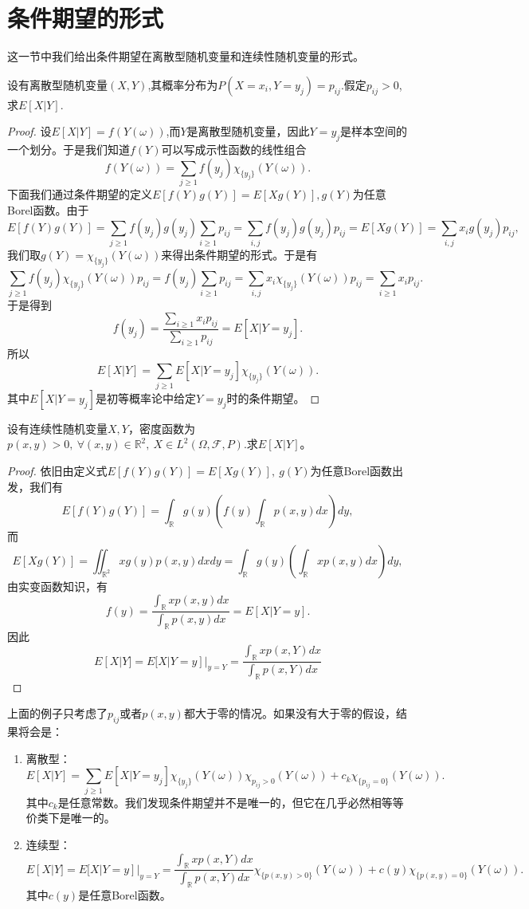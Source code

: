 \documentclass[lang=cn,10pt]{elegantbook}
\begin{document}
	\section{条件期望的形式}
	这一节中我们给出条件期望在离散型随机变量和连续性随机变量的形式。
	\begin{example}
		设有离散型随机变量\((X,Y)\),其概率分布为\(P(X=x_i,Y=y_j)=p_{ij}\).假定\(p_{ij}>0\),求\(E[X|Y]\).
	\end{example}
	\begin{proof}
		设\(E[X|Y]=f(Y(\omega))\),而\(Y\)是离散型随机变量，因此\(Y=y_j\)是样本空间的一个划分。于是我们知道\(f(Y)\)可以写成示性函数的线性组合
		\[f(Y(\omega))=\sum_{j\ge1}f(y_j)\chi_{\{y_j\}}(Y(\omega)).\]
		下面我们通过条件期望的定义\(E[f(Y)g(Y)]=E[Xg(Y)],g(Y)\)为任意Borel函数。由于\[E[f(Y)g(Y)]=\sum_{j\ge1}f(y_j)g(y_j)\sum_{i\ge1}p_{ij}=\sum_{i,j}f(y_j)g(y_j)p_{ij}=E[Xg(Y)]=\sum_{i,j}x_ig(y_j)p_{ij},\]
		我们取\(g(Y)=\chi_{\{y_j\}}(Y(\omega))\)来得出条件期望的形式。于是有
		\[\sum_{j\ge1}f(y_j)\chi_{\{y_j\}}(Y(\omega))p_{ij}=f(y_j)\sum_{i\ge1}p_{ij}=\sum_{i,j}x_i\chi_{\{y_j\}}(Y(\omega))p_{ij}=\sum_{i\ge1}x_ip_{ij}.\]
		于是得到
		\[f(y_j)=\frac{\sum_{i\ge1}x_ip_{ij}}{\sum_{i\ge1}p_{ij}}=E[X|Y=y_j].\]
		所以
		\[E[X|Y]=\sum_{j\ge1}E[X|Y=y_j]\chi_{\{y_j\}}(Y(\omega)).\]
		其中\(E[X|Y=y_j]\)是初等概率论中给定\(Y=y_j\)时的条件期望。
	\end{proof}
	\begin{example}
		设有连续性随机变量\(X,Y\)，密度函数为\(p(x,y)>0,\ \forall (x,y)\in \mathbb{R}^2,\ X\in L^2(\Omega,\mathcal{F},P)\).求\(E[X|Y]\)。
	\end{example}
	\begin{proof}
		依旧由定义式\(E[f(Y)g(Y)]=E[Xg(Y)],\ g(Y)\)为任意Borel函数出发，我们有
		\[E[f(Y)g(Y)]=\int_\mathbb{R}g(y)(f(y)\int_\mathbb{R}p(x,y)dx)dy,\]
		而
		\[E[Xg(Y)]=\iint_{\mathbb{R}^2}xg(y)p(x,y)dxdy=\int_\mathbb{R}g(y)(\int_\mathbb{R}xp(x,y)dx)dy,\]
		由实变函数知识，有
		\[f(y)=\frac{\int_\mathbb{R}xp(x,y)dx}{\int_\mathbb{R}p(x,y)dx}=E[X|Y=y].\]
		因此
		\[E[X|Y]=E[X|Y=y]|_{y=Y}=\frac{\int_\mathbb{R}xp(x,Y)dx}{\int_\mathbb{R}p(x,Y)dx}\]
	\end{proof}
	\begin{note}
		上面的例子只考虑了\(p_{ij}\)或者\(p(x,y)\)都大于零的情况。如果没有大于零的假设，结果将会是：
		\begin{enumerate}
			\item 离散型：
			\[E[X|Y]=\sum_{j\ge1}E[X|Y=y_j]\chi_{\{y_j\}}(Y(\omega))\chi_{p_{ij}>0}(Y(\omega))+c_k\chi_{\{p_{ij}=0\}}(Y(\omega)).\]
			其中\(c_k\)是任意常数。我们发现条件期望并不是唯一的，但它在几乎必然相等等价类下是唯一的。
			\item 连续型：
			\[E[X|Y]=E[X|Y=y]|_{y=Y}=\frac{\int_\mathbb{R}xp(x,Y)dx}{\int_\mathbb{R}p(x,Y)dx}\chi_{\{p(x,y)>0\}}(Y(\omega))+c(y)\chi_{\{p(x,y)=0\}}(Y(\omega)).\]
			其中\(c(y)\)是任意Borel函数。
		\end{enumerate}
	\end{note}
\end{document}
